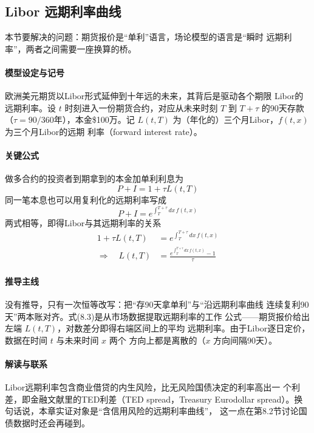 \subsection{Libor 远期利率曲线}

本节要解决的问题：期货报价是“单利”语言，场论模型的语言是“瞬时
远期利率”，两者之间需要一座换算的桥。

\paragraph{模型设定与记号}
欧洲美元期货以Libor形式延伸到十年远的未来，其背后是驱动各个期限
Libor的远期利率。设 $t$ 时刻进入一份期货合约，对应从未来时刻 $T$
到 $T+\tau$ 的90天存款（$\tau=90/360$年），本金\$100万。记
$L(t,T)$ 为（年化的）三个月Libor，$f(t,x)$ 为三个月Libor的远期
利率（forward interest rate）。

\paragraph{关键公式}
做多合约的投资者到期拿到的本金加单利利息为
\begin{equation*}
P+I=1+\tau L(t,T)
\tag{8.1}
\end{equation*}
同一笔本息也可以用复利化的远期利率写成
\begin{equation*}
P+I=e^{\int_{T}^{T+\tau}dx\,f(t,x)}
\tag{8.2}
\end{equation*}
两式相等，即得Libor与其远期利率的关系
\begin{align*}
1+\tau L(t,T)&=e^{\int_{T}^{T+\tau}dx\,f(t,x)}\\
\Rightarrow\quad L(t,T)&=\frac{e^{\int_{T}^{T+\tau}dx\,f(t,x)}-1}{\tau}
\tag{8.3}
\end{align*}

\paragraph{推导主线}
没有推导，只有一次恒等改写：把“存90天拿单利”与“沿远期利率曲线
连续复利90天”两本账对齐。式(8.3)是从市场数据提取远期利率的工作
公式——期货报价给出左端 $L(t,T)$，对数差分即得右端区间上的平均
远期利率。由于Libor逐日定价，数据在时间 $t$ 与未来时间 $x$ 两个
方向上都是离散的（$x$ 方向间隔90天）。

\paragraph{解读与联系}
Libor远期利率包含商业借贷的内生风险，比无风险国债决定的利率高出一
个利差，即金融文献里的TED利差（TED spread，Treasury Eurodollar
spread）。换句话说，本章实证对象是“含信用风险的远期利率曲线”，
这一点在第8.2节讨论国债数据时还会再碰到。

